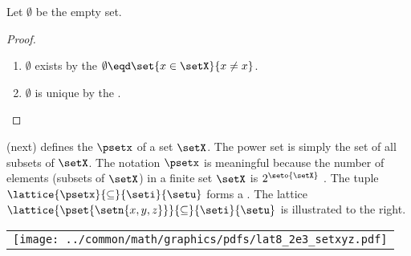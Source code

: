 \begin{definition}
\label{def:set_emptyset}
\end{definition}

\begin{proposition}
\label{prop:set_emptyset}
Let $\emptyset$ be the empty set.
\end{proposition}
\begin{proof}
  \begin{enumerate}
    \item $\emptyset$ exists by the  
            $\emptyset \eqd \set{x\in\setX}{x\ne x}$.
    \item $\emptyset$ is unique by the  .
  \end{enumerate}
\end{proof}



\begin{minipage}[c]{2\tw/3}
   (next) defines the  $\psetx$ of a set $\setX$.
  The power set is simply the set of all subsets of $\setX$.
  The notation $\psetx$ is meaningful because the number of elements (subsets of $\setX$)
  in a finite set $\setX$ is $2^\seto{\setX}$ .
  The tuple $\lattice{\psetx}{\subseteq}{\seti}{\setu}$ forms a  .
  The lattice $\lattice{\pset{\setn{x,y,z}}}{\subseteq}{\seti}{\setu}$
  is illustrated to the right.
\end{minipage}%
\hfill%
\begin{tabular}{c}%
  \texttt{[image: ../common/math/graphics/pdfs/lat8\_2e3\_setxyz.pdf]}%
\end{tabular}

